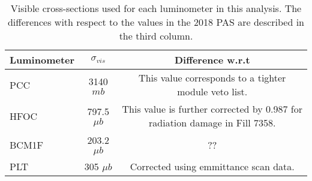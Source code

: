 \vspace{24pt}
\begin{table}[h]
  \caption{Visible cross-sections used for each luminometer in this analysis. The differences with respect to the values in the 2018 PAS \cite{CMS-PAS-LUM-18-002} are described in the third column.}
  \label{tab:crossections}
    \begin{tabular}{l|c|c}
      \hline
      Luminometer & $\sigma_{vis}$ & Difference w.r.t \cite{CMS-PAS-LUM-18-002}\\
      \hline
      PCC   &  3140  $mb$     & This value corresponds to a tighter module veto list. \\
      HFOC  &  797.5 $\mu b$  & This value is further corrected by 0.987 for radiation damage in Fill 7358. \\
      BCM1F &  203.2 $\mu b$  &  ?? \\
      PLT   &  305   $\mu b$  & Corrected using emmittance scan data. \\
      \hline\hline
    \end{tabular}
\end{table}
